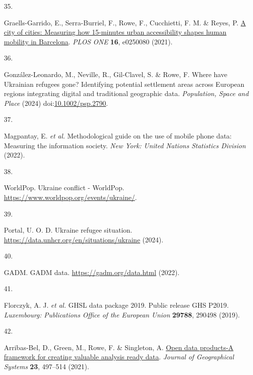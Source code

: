 \documentclass[
  11pt,
]{article}
\newlength{\cslhangindent}
\newlength{\csllabelwidth}
\newenvironment{CSLReferences}[2] %
 {\begin{list}{}{%
  \setlength{\itemindent}{0pt}
  \setlength{\leftmargin}{0pt}
  \setlength{\parsep}{0pt}
  \ifodd #1
   \setlength{\leftmargin}{\cslhangindent}
   \setlength{\itemindent}{-1\cslhangindent}
  \fi
  \setlength{\itemsep}{#2\baselineskip}}}
 {\end{list}}
\newcommand{\CSLLeftMargin}[1]{\parbox[t]{\csllabelwidth}{\strut#1\strut}}
\newcommand{\CSLRightInline}[1]{\parbox[t]{\linewidth - \csllabelwidth}{\strut#1\strut}}
\begin{document}
\begin{CSLReferences}{0}{0}
\CSLLeftMargin{35. }%
\CSLRightInline{Graells-Garrido, E., Serra-Burriel, F., Rowe, F.,
Cucchietti, F. M. \& Reyes, P.
\href{https://doi.org/10.1371/journal.pone.0250080}{A city of cities:
Measuring how 15-minutes urban accessibility shapes human mobility in
Barcelona}. \emph{PLOS ONE} \textbf{16}, e0250080 (2021).}

\CSLLeftMargin{36. }%
\CSLRightInline{González-Leonardo, M., Neville, R., Gil-Clavel, S. \&
Rowe, F. Where have Ukrainian refugees gone? Identifying potential
settlement areas across European regions integrating digital and
traditional geographic data. \emph{Population, Space and Place} (2024)
doi:\href{https://doi.org/10.1002/psp.2790}{10.1002/psp.2790}.}

\CSLLeftMargin{37. }%
\CSLRightInline{Magpantay, E. \emph{et al.} Methodological guide on the
use of mobile phone data: Measuring the information society. \emph{New
York: United Nations Statistics Division} (2022).}

\CSLLeftMargin{38. }%
\CSLRightInline{WorldPop. Ukraine conflict - WorldPop.
\url{https://www.worldpop.org/events/ukraine/}.}

\CSLLeftMargin{39. }%
\CSLRightInline{Portal, U. O. D. Ukraine refugee situation.
\url{https://data.unhcr.org/en/situations/ukraine} (2024).}

\CSLLeftMargin{40. }%
\CSLRightInline{GADM. GADM data. \url{https://gadm.org/data.html}
(2022).}

\CSLLeftMargin{41. }%
\CSLRightInline{Florczyk, A. J. \emph{et al.} {GHSL data package 2019.
Public release GHS P2019}. \emph{{Luxembourg: Publications Office of the
European Union}} \textbf{29788}, 290498 (2019).}

\CSLLeftMargin{42. }%
\CSLRightInline{Arribas-Bel, D., Green, M., Rowe, F. \& Singleton, A.
\href{https://doi.org/10.1007/s10109-021-00363-5}{Open data products-A
framework for creating valuable analysis ready data}. \emph{Journal of
Geographical Systems} \textbf{23}, 497--514 (2021).}

\end{CSLReferences}
\end{document}
